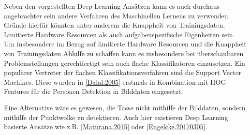Neben den vorgestellten Deep Learning Ansätzen kann es auch durchaus angebrachter sein andere Verfahren des Maschinellen Lernens zu verwenden. Gründe hierfür könnten unter anderem die Knappheit von Trainingsdaten, Limitierte Hardware Resourcen als auch aufgabenspezifische Eigenheiten sein. Um insbesondere im Bezug auf limitierte Hardware Resourcen und die Knappheit von Trainingsdaten Abhilfe zu schaffen kann es insbesondere bei überschaubaren Problemstellungen gerechtfertigt sein auch flache Klassifikatoren einzusetzen. Ein populärer Vertreter der flachen Klassifikationsverfahren sind die Support Vector Machines. Diese wurden in \ref{Dalal.2005} erstmals in Kombination mit HOG Features für die Personen Detektion in Bilddaten eingesetzt.

Eine Alternative wäre es gewesen, die Tasse nicht mithilfe der Bilddaten, sondern mithilfe der Punktwolke zu detektieren. Auch hier existieren Deep Learning basierte Ansätze wie z.B. \ref{Maturana.2015} oder \ref{Engelcke.20170305}.